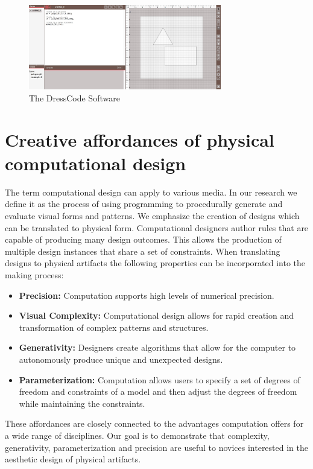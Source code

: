 \documentclass{sigchi}
\begin{document}
\begin{figure}
\begin{center}
\includegraphics[width=0.75\textwidth]{images/application_image_sm_content.jpg}
\caption{The DressCode Software}
\label{fig:application_image}
\end{center}
\end{figure}

\section{Creative affordances of physical computational design}
The term computational design can apply to various media. In our research we define it as the process of using programming to procedurally generate and evaluate visual forms and patterns. We emphasize the creation of designs which can be translated to physical form. Computational designers author rules that are capable of producing many design outcomes. This allows the production of multiple design instances that share a set of constraints. When translating designs to physical artifacts the following properties can be incorporated into the making process:
\begin{itemize}
\item \textbf{Precision:} Computation supports high levels of numerical precision.
\vspace{-8pt}
\item \textbf{Visual Complexity:} Computational design allows for rapid creation and transformation of complex patterns and structures.
\vspace{-6pt}
\item \textbf{Generativity:} Designers create algorithms that allow for the computer to autonomously produce unique and unexpected designs.
\vspace{-6pt}
\item \textbf{Parameterization:} Computation allows users to specify a set of degrees of freedom and constraints of a model and then adjust the degrees of freedom while maintaining the constraints.
\vspace{-6pt}
\end{itemize} 
These affordances are closely connected to the advantages computation offers for a wide range of disciplines. Our goal is to demonstrate that complexity, generativity, parameterization and precision are useful to novices interested in the aesthetic design of physical artifacts.
\end{document}
